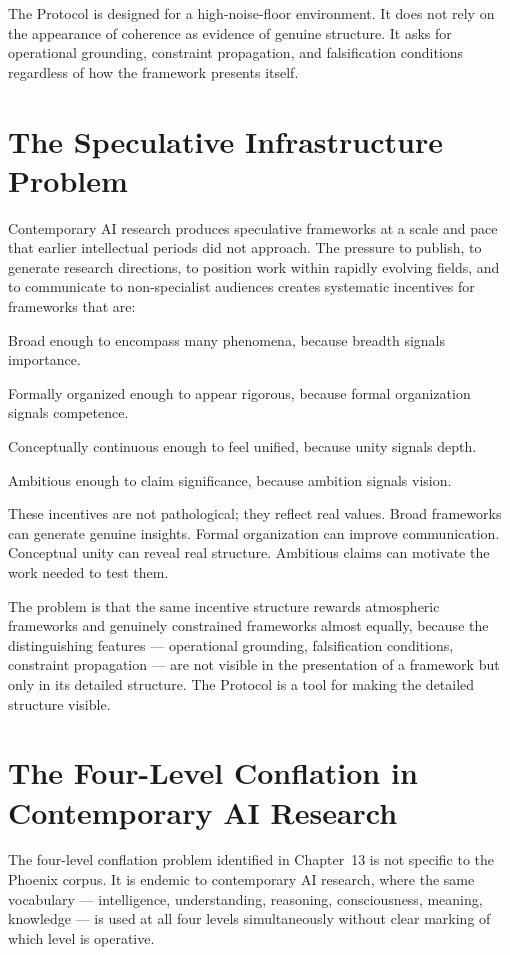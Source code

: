 The \Ortyx{} Protocol is designed for a high-noise-floor
environment. It does not rely on the appearance of
coherence as evidence of genuine structure. It asks
for operational grounding, constraint propagation,
and falsification conditions regardless of how the
framework presents itself.

\section{The Speculative Infrastructure Problem}
\label{sec:speculative-infrastructure}

Contemporary AI research produces speculative frameworks
at a scale and pace that earlier intellectual periods
did not approach. The pressure to publish, to generate
research directions, to position work within rapidly
evolving fields, and to communicate to non-specialist
audiences creates systematic incentives for frameworks
that are:

Broad enough to encompass many phenomena, because
breadth signals importance.

Formally organized enough to appear rigorous, because
formal organization signals competence.

Conceptually continuous enough to feel unified, because
unity signals depth.

Ambitious enough to claim significance, because
ambition signals vision.

These incentives are not pathological; they reflect
real values. Broad frameworks can generate genuine
insights. Formal organization can improve communication.
Conceptual unity can reveal real structure. Ambitious
claims can motivate the work needed to test them.

The problem is that the same incentive structure rewards
atmospheric frameworks and genuinely constrained
frameworks almost equally, because the distinguishing
features --- operational grounding, falsification
conditions, constraint propagation --- are not visible
in the presentation of a framework but only in its
detailed structure. The \Ortyx{} Protocol is a tool
for making the detailed structure visible.

\section{The Four-Level Conflation in Contemporary AI Research}
\label{sec:contemporary-conflation}

The four-level conflation problem identified in
Chapter~13 is not specific to the Phoenix corpus.
It is endemic to contemporary AI research, where the
same vocabulary --- intelligence, understanding,
reasoning, consciousness, meaning, knowledge --- is
used at all four levels simultaneously without clear
marking of which level is operative.

